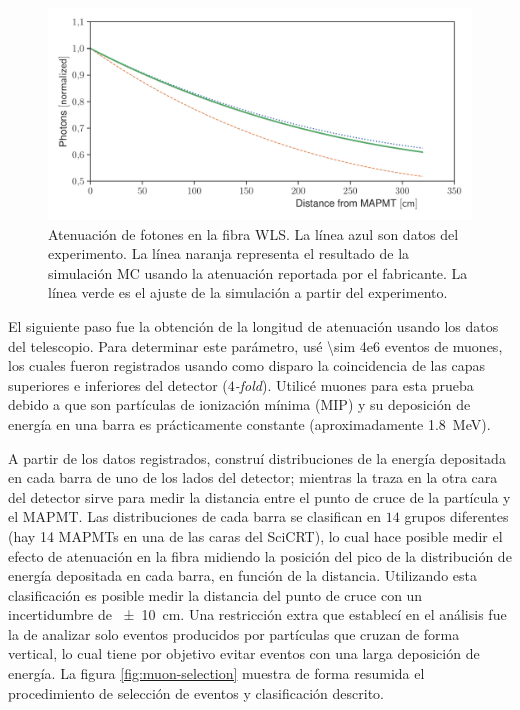 \begin{figure}
        \centering
        \includegraphics[width=\textwidth]{data_atlength.pdf}
        \caption{Atenuación de fotones en la fibra WLS. La línea azul son datos del experimento. La línea naranja representa el resultado de la simulación MC usando la atenuación reportada por el fabricante. La línea verde es el ajuste de la simulación a partir del experimento.}
        \label{fig:atlength}
\end{figure}

El siguiente paso fue la obtención de la longitud de atenuación usando los datos del telescopio. Para determinar este parámetro, usé \num{\sim 4e6} eventos de muones, los cuales fueron registrados usando como disparo la coincidencia de las capas superiores e inferiores del detector (\emph{$4$-fold}). Utilicé muones para esta prueba debido a que son partículas de ionización mínima (MIP) y su deposición de energía en una barra es prácticamente constante (aproximadamente \SI{1.8}{\mega\electronvolt}).

A partir de los datos registrados, construí distribuciones de la energía depositada en cada barra de uno de los lados del detector; mientras la traza en la otra cara del detector sirve para medir la distancia entre el punto de cruce de la partícula y el MAPMT. Las distribuciones de cada barra se clasifican en $14$ grupos diferentes (hay \num{14} MAPMTs en una de las caras del SciCRT), lo cual hace posible medir el efecto de atenuación en la fibra midiendo la posición del pico de la distribución de energía depositada en cada barra, en función de la distancia. Utilizando esta clasificación es posible medir la distancia del punto de cruce con un incertidumbre de \SI{\pm 10}{\cm}. Una restricción extra que establecí en el análisis fue la de analizar solo eventos producidos por partículas que cruzan de forma vertical, lo cual tiene por objetivo evitar eventos con una larga deposición de energía. La figura \ref{fig:muon-selection} muestra de forma resumida el procedimiento de selección de eventos y clasificación descrito.

